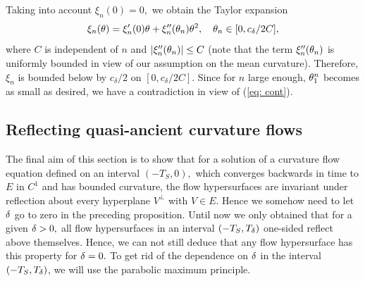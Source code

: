 \documentclass{amsart}
\begin{document}
{Taking into account $\xi_{n}(0)=0,$ we obtain the Taylor expansion
$$\xi_{n}(\theta)=\xi_{n}'(0)\theta+\xi_{n}''(\theta_{n})\theta^{2},\quad \theta_{n}\in[0,c_{\delta}/2C],$$
where $C$ is independent of $n$ and $|\xi''_{n}(\theta_{n})|\leq C$ (note that the term $\xi''_{n}(\theta_{n})$ is uniformly bounded in view of our assumption on the mean curvature). Therefore, $\xi_n$ is bounded below by $c_{\delta}/2$ on $[0,c_{\delta}/2C]$. Since for $n$ large enough, $\theta_{1}^{n}$ becomes as small as desired, we have a contradiction in view of (\ref{eq: cont}).
}
\subsection{Reflecting quasi-ancient curvature flows}
The final aim of this section is to show that for a solution of a curvature flow equation defined on an interval $(-T_{S},0),$ which converges backwards in time to $E$ in $C^{1}$ and has bounded curvature, the flow hypersurfaces are invariant under reflection about every hyperplane $V^{\perp}$ with $V\in E.$ Hence we somehow need to let $\delta$ go to zero in the preceding proposition. Until now we only obtained that for a given $\delta>0,$ all flow hypersurfaces in an interval $(-T_{S},T_{\delta})$ one-sided reflect above themselves. Hence, we can not still deduce that any flow hypersurface has this property for $\delta=0.$ To get rid of the dependence on $\delta$ in the interval $(-T_{S},T_{\delta})$, we will use the parabolic maximum principle.
\end{document}
